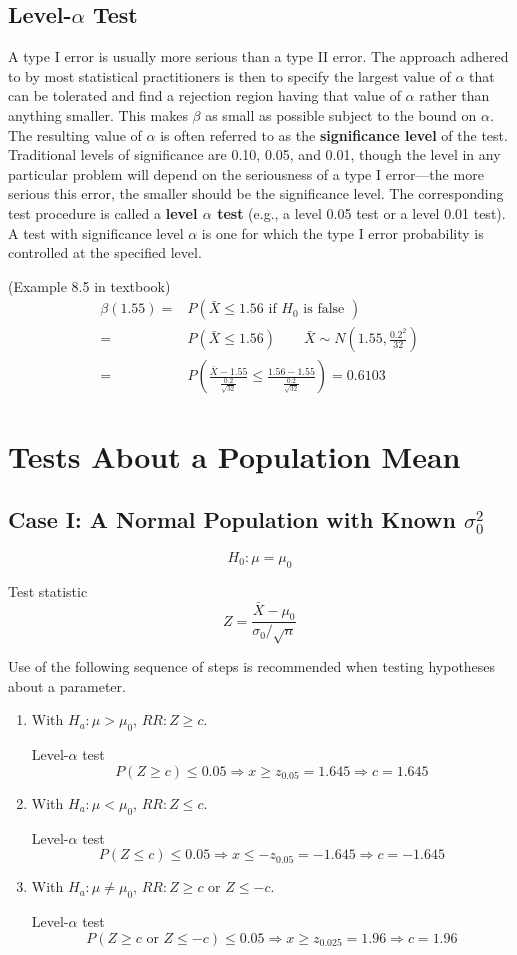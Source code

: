 \subsection{Level-$\alpha$ Test}
A type I error is usually more serious than a type II error. The approach adhered to by most statistical practitioners is then to specify the largest value of $\alpha$ that can be tolerated and find a rejection region having that value of $\alpha$ rather than anything smaller. This makes $\beta$ as small as possible subject to the bound on $\alpha$. The resulting value of $\alpha$ is often referred to as the \textbf{significance level} of the test. Traditional levels of significance are 0.10, 0.05, and 0.01, though the level in any particular problem will depend on the seriousness of a type I error—the more serious this error, the smaller should be the significance level. The corresponding test procedure is called a \textbf{level $\alpha$ test} (e.g., a level 0.05 test or a level 0.01 test). A test with significance level $\alpha$ is one for which the type I error probability is controlled at the specified level.

\begin{exmp}
(Example 8.5 in textbook)
\begin{align*}
\beta(1.55)= & P(\bar{X}\leq 1.56 \text{ if }H_0 \text{ is false } ) \\
= & P(\bar{X} \leq 1.56) \qquad \bar{X}\sim N\left(1.55,\frac{0.2^2}{32}\right) \\
= & P\left(\frac{\bar{X}-1.55}{\frac{0.2}{\sqrt{32}}} \leq  \frac{1.56-1.55}{\frac{0.2}{\sqrt{32}}} \right)=0.6103
\end{align*}
\end{exmp}



\section{Tests About a Population Mean}
\subsection{Case I: A Normal Population with Known $\sigma_0^2$}
\[H_0:\mu=\mu_0\]

Test statistic 
\[Z=\frac{\bar{X}-\mu_0}{\sigma_0/\sqrt{n}}\]

Use of the following sequence of steps is recommended when testing hypotheses
about a parameter.
\begin{enumerate}
\item With $H_a: \mu>\mu_0$, $RR:Z\geq c$.

Level-$\alpha$ test
\[P(Z\geq c)\leq 0.05 \Rightarrow x \geq z_{0.05}=1.645 \Rightarrow c=1.645\]
\item With $H_a: \mu<\mu_0$, $RR:Z\leq c$.

Level-$\alpha$ test
\[P(Z\leq c)\leq 0.05 \Rightarrow x \leq -z_{0.05}=-1.645 \Rightarrow c=-1.645\]
\item With $H_a: \mu\neq\mu_0$, $RR:Z\geq c$ or $Z \leq -c$.

Level-$\alpha$ test
\[P(Z\geq c \text{ or } Z \leq -c)\leq 0.05 \Rightarrow x \geq z_{0.025}=1.96 \Rightarrow c=1.96\]
\end{enumerate}


